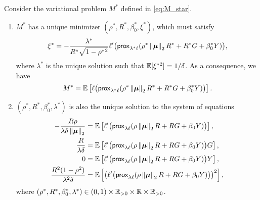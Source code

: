 \begin{lem}
\label{lem:M_star_var}
    Consider the variational problem $M^*$ defined in \cref{eq:M_star}.
    \begin{enumerate}[label=(\alph*)]
        \item \label{lem:M_star_var(a)}
        $M^*$ has a unique minimizer $(\rho^*, R^*, \beta_0^*, \xi^*)$, which must satisfy
        \begin{equation*}
            \xi^* = - \frac{\lambda^*}{R^* \sqrt{1 - \rho^*{}^2}} \ell'\bigl(\mathsf{prox}_{ \lambda^* \ell}( \rho^*\left\|{{\boldsymbol{\mu}}}\right\|_2 R^* + R^* G + \beta_0^* Y )\bigr),
        \end{equation*}
        where $\lambda^*$ is the unique solution such that $\mathbb{E}[\xi^{* 2}] = 1/\delta$. As a consequence, we have
        \begin{equation*}
           M^* = \mathbb{E} \left[ \ell \bigl( \mathsf{prox}_{ \lambda^* \ell}( \rho^*\left\|{{\boldsymbol{\mu}}}\right\|_2 R^* + R^* G + \beta_0^* Y )
                \bigr) \right].
        \end{equation*}

        
        \item \label{lem:M_star_var(b)}
        $(\rho^*, R^*, \beta_0^*, \lambda^*)$ is also the unique solution to the system of equations
        \begin{equation}\label{eq:sys_eq_Q}
            \begin{aligned}
                - \frac{R \rho}{\lambda \delta \left\|{{\boldsymbol{\mu}}}\right\|_2}
                & = 
                \mathbb{E} \left[ \ell'\bigl( \mathsf{prox}_{ \lambda \ell}( \rho\left\|{{\boldsymbol{\mu}}}\right\|_2 R + RG + \beta_0 Y ) \bigr) \right],
                \\
                \frac{R}{\lambda \delta }
                & = 
                \mathbb{E} \left[ \ell'\bigl( \mathsf{prox}_{ \lambda \ell}( \rho\left\|{{\boldsymbol{\mu}}}\right\|_2 R + RG + \beta_0 Y ) \bigr) G \right],
                \\
                0
                & = 
                \mathbb{E} \left[\ell'\bigl( \mathsf{prox}_{ \lambda \ell}( \rho\left\|{{\boldsymbol{\mu}}}\right\|_2 R + RG + \beta_0 Y ) \bigr) Y \right],
                \\
                \frac{R^2 (1 - \rho^2)}{\lambda^2 \delta}
                & = 
                \mathbb{E} \left[ \left(\ell'\bigl( \mathsf{prox}_{ \lambda \ell}( \rho\left\|{{\boldsymbol{\mu}}}\right\|_2 R + RG + \beta_0 Y ) \bigr) \right)^2 \right],
            \end{aligned}
        \end{equation}
        where $(\rho^*, R^*, \beta_0^*, \lambda^*) \in (0, 1) \times \mathbb{R}_{>0} \times \mathbb{R} \times \mathbb{R}_{> 0}$.


\end{enumerate}
\end{lem}
